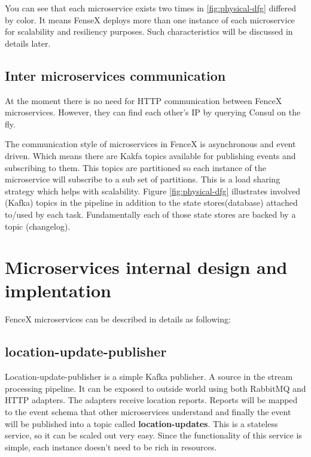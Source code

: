\documentclass[a4]{report}
\begin{document}
    You can see that each microservice exists two times in \ref{fig:physical-dfg} differed by color.
    It means FenseX deploys more than one instance of each microservice for scalability and resiliency purposes.
    Such characteristics will be discussed in details later.

    \subsection{Inter microservices communication}
    At the moment there is no need for HTTP communication between FenceX microservices.
    However, they can find each other's IP by querying Consul on the fly.

    The communication style of microservices in FenceX is asynchronous and event driven.
    Which means there are Kakfa topics available for publishing events and subscribing to them.
    This topics are partitioned so each instance of the microservice will subscribe to a sub set of partitions.
    This is a load sharing strategy which helps with scalability.
    Figure \ref{fig:physical-dfg} illustrates involved (Kafka) topics in the pipeline in addition to the state
    stores(database) attached to/used by each task.
    Fundamentally each of those state stores are backed by a topic (changelog).


    \section{Microservices internal design and implentation}
    FenceX microservices can be described in details as following:

    \subsection{location-update-publisher}
    Location-update-publisher is a simple Kafka publisher.
    A source in the stream processing pipeline.
    It can be exposed to outside world using both RabbitMQ and HTTP adapters.
    The adapters receive location reports.
    Reports will be mapped to the event schema that other microservices
    understand and finally the event will be published into a topic called \textbf{location-updates}.
    This is a stateless service, so it can be scaled out very easy.
    Since the functionality of this service is simple, each instance doesn't need to be rich in resources.
\end{document}
